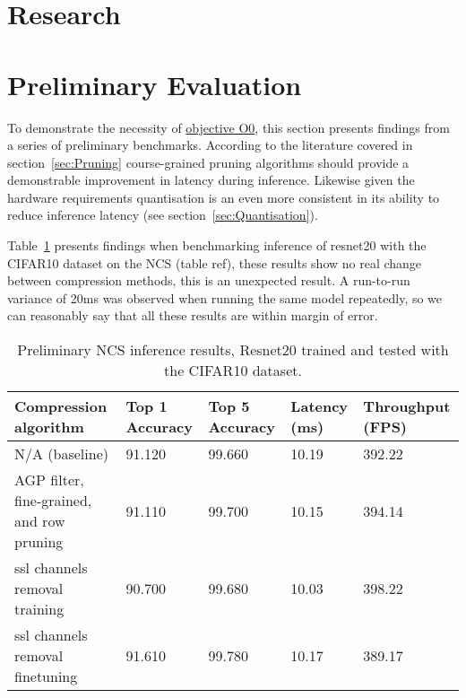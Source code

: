 \documentclass[11pt]{article}
\begin{document}
\newpage
\section{Research}


\newpage
\section{Preliminary Evaluation}\label{sec:prelimEval}
To demonstrate the necessity of \hyperref[obj:VerifyComp]{objective O0}, this section presents findings from a series of preliminary benchmarks. 
According to the literature covered in section~\ref{sec:Pruning} course-grained pruning algorithms should provide a demonstrable improvement in latency during inference.
Likewise given the hardware requirements quantisation is an even more consistent in its ability to reduce inference latency (see section~\ref{sec:Quantisation}).

Table~\ref{tab:PrelimResults} presents findings when benchmarking inference of resnet20 with the CIFAR10 dataset on the NCS (table ref), these results show no real change between compression methods, this is an unexpected result.
A run-to-run variance of 20ms was observed when running the same model repeatedly, so we can reasonably say that all these results are within margin of error.

\begin{table}[H]
    \begin{tabular}{@{}|p{5cm}|p{2cm}|p{2cm}|p{2cm}|p{2cm}|@{}}
    \toprule
    Compression algorithm                     & Top 1 Accuracy & Top 5 Accuracy & Latency (ms) & Throughput (FPS) \\ \midrule
    N/A (baseline)                            & 91.120         & 99.660         & 10.19        & 392.22           \\ \midrule
    AGP filter, fine-grained, and row pruning & 91.110         & 99.700         & 10.15        & 394.14           \\ \midrule
    ssl channels removal training             & 90.700         & 99.680         & 10.03        & 398.22           \\ \midrule
    ssl channels removal finetuning           & 91.610         & 99.780         & 10.17        & 389.17           \\
    \bottomrule
    \end{tabular}
    \caption{Preliminary NCS inference results, Resnet20 trained and tested with the CIFAR10 dataset.}
    \label{tab:PrelimResults}
\end{table}
\end{document}
